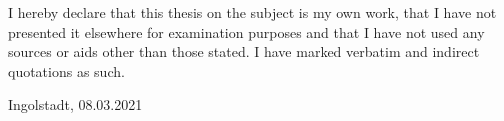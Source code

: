 \thispagestyle{plain}

I hereby declare that this thesis on the subject is my own work, that I have not presented it elsewhere for examination purposes and that I have not used any sources or aids other than those stated. I have marked verbatim and indirect quotations as such.
\vspace{3cm}

Ingolstadt, 08.03.2021
